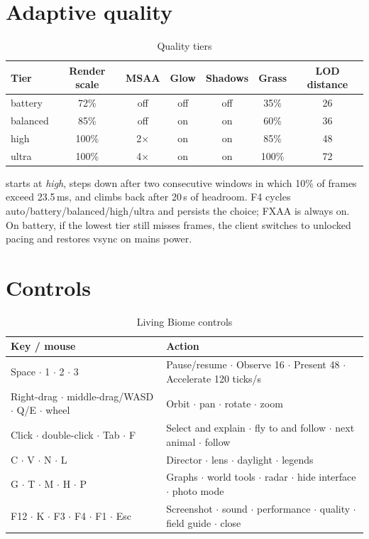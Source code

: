 \section{Adaptive quality}
\begin{table}[htbp]
\centering
\caption{Quality tiers}
\begin{tabular}{lcccccc}
\toprule
Tier & Render scale & MSAA & Glow & Shadows & Grass & LOD distance \\
\midrule
battery & 72\% & off & off & off & 35\% & 26 \\
balanced & 85\% & off & on & on & 60\% & 36 \\
high & 100\% & 2$\times$ & on & on & 85\% & 48 \\
ultra & 100\% & 4$\times$ & on & on & 100\% & 72 \\
\bottomrule
\end{tabular}
\end{table}
 starts at \emph{high}, steps down after two consecutive windows in
which 10\% of frames exceed 23.5\,ms, and climbs back after 20\,s of headroom. F4
cycles auto/battery/balanced/high/ultra and persists the choice; FXAA is always on.
On battery, if the lowest tier still misses frames, the client switches to unlocked
pacing and restores vsync on mains power.

\section{Controls}
\begin{table}[htbp]
\centering
\caption{Living Biome controls}
\begin{tabularx}{\textwidth}{lL}
\toprule
Key / mouse & Action \\
\midrule
Space $\cdot$ 1 $\cdot$ 2 $\cdot$ 3 & Pause/resume $\cdot$ Observe 16 $\cdot$ Present 48 $\cdot$ Accelerate 120 ticks/s \\
Right-drag $\cdot$ middle-drag/WASD $\cdot$ Q/E $\cdot$ wheel & Orbit $\cdot$ pan $\cdot$ rotate $\cdot$ zoom \\
Click $\cdot$ double-click $\cdot$ Tab $\cdot$ F & Select and explain $\cdot$ fly to and follow $\cdot$ next animal $\cdot$ follow \\
C $\cdot$ V $\cdot$ N $\cdot$ L & Director $\cdot$ lens $\cdot$ daylight $\cdot$ legends \\
G $\cdot$ T $\cdot$ M $\cdot$ H $\cdot$ P & Graphs $\cdot$ world tools $\cdot$ radar $\cdot$ hide interface $\cdot$ photo mode \\
F12 $\cdot$ K $\cdot$ F3 $\cdot$ F4 $\cdot$ F1 $\cdot$ Esc & Screenshot $\cdot$ sound $\cdot$ performance $\cdot$ quality $\cdot$ field guide $\cdot$ close \\
\bottomrule
\end{tabularx}
\end{table}

